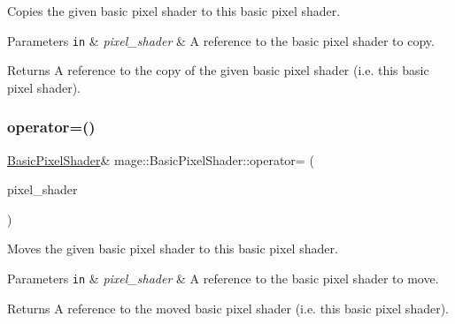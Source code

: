 Copies the given basic pixel shader to this basic pixel shader.


\begin{DoxyParams}[1]{Parameters}
\mbox{\tt in}  & {\em pixel\+\_\+shader} & A reference to the basic pixel shader to copy. \\
\hline
\end{DoxyParams}
\begin{DoxyReturn}{Returns}
A reference to the copy of the given basic pixel shader (i.\+e. this basic pixel shader). 
\end{DoxyReturn}
\hypertarget{classmage_1_1_basic_pixel_shader_a5d6224f0454d1d1f9583f6b9f8ad8201}{}\label{classmage_1_1_basic_pixel_shader_a5d6224f0454d1d1f9583f6b9f8ad8201} 
\subsubsection{\texorpdfstring{operator=()}{operator=()}\hspace{0.1cm}{\footnotesize\ttfamily [2/2]}}
{\footnotesize\ttfamily \hyperlink{classmage_1_1_basic_pixel_shader}{Basic\+Pixel\+Shader}\& mage\+::\+Basic\+Pixel\+Shader\+::operator= (\begin{DoxyParamCaption}\item[{\hyperlink{classmage_1_1_basic_pixel_shader}{Basic\+Pixel\+Shader} \&\&}]{pixel\+\_\+shader }\end{DoxyParamCaption})\hspace{0.3cm}{\ttfamily [delete]}}

Moves the given basic pixel shader to this basic pixel shader.


\begin{DoxyParams}[1]{Parameters}
\mbox{\tt in}  & {\em pixel\+\_\+shader} & A reference to the basic pixel shader to move. \\
\hline
\end{DoxyParams}
\begin{DoxyReturn}{Returns}
A reference to the moved basic pixel shader (i.\+e. this basic pixel shader). 
\end{DoxyReturn}
\hypertarget{classmage_1_1_basic_pixel_shader_a95b6a4ed73ac8c9b31348e93f1fdf99d}{}\label{classmage_1_1_basic_pixel_shader_a95b6a4ed73ac8c9b31348e93f1fdf99d} 
